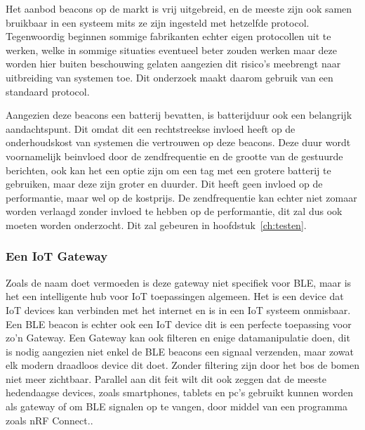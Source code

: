 Het aanbod beacons op de markt is vrij uitgebreid, en de meeste zijn ook samen bruikbaar in een systeem mits ze zijn ingesteld met hetzelfde protocol. Tegenwoordig beginnen sommige fabrikanten echter eigen protocollen uit te werken, welke in sommige situaties eventueel beter zouden werken maar deze worden hier buiten beschouwing gelaten aangezien dit risico's meebrengt naar uitbreiding van systemen toe. Dit onderzoek maakt daarom gebruik van een standaard protocol.

Aangezien deze beacons een batterij bevatten, is batterijduur ook een belangrijk aandachtspunt. Dit omdat dit een rechtstreekse invloed heeft op de onderhoudskost van systemen die vertrouwen op deze beacons. Deze duur wordt voornamelijk beinvloed door de zendfrequentie en de grootte van de gestuurde berichten, ook kan het een optie zijn om een tag met een grotere batterij te gebruiken, maar deze zijn groter en duurder. Dit heeft geen invloed op de performantie, maar wel op de kostprijs. De zendfrequentie kan echter niet zomaar worden verlaagd zonder invloed te hebben op de performantie, dit zal dus ook moeten worden onderzocht. Dit zal gebeuren in hoofdstuk~\ref{ch:testen}.

\subsubsection{Een IoT Gateway}
Zoals de naam doet vermoeden is deze gateway niet specifiek voor BLE, maar is het een intelligente hub voor IoT toepassingen algemeen. Het is een device dat IoT devices kan verbinden met het internet en is in een IoT systeem onmisbaar. Een BLE beacon is echter ook een IoT device dit is een perfecte toepassing voor zo'n Gateway.\autocite{MultiTech2022} Een Gateway kan ook filteren en enige datamanipulatie doen, dit is nodig aangezien niet enkel de BLE beacons een signaal verzenden, maar zowat elk modern draadloos device dit doet. Zonder filtering zijn door het bos de bomen niet meer zichtbaar. Parallel aan dit feit wilt dit ook zeggen dat de meeste hedendaagse devices, zoals smartphones, tablets en pc's gebruikt kunnen worden als gateway of om BLE signalen op te vangen, door middel van een programma zoals nRF Connect.\autocite{Semiconductor2022}.

